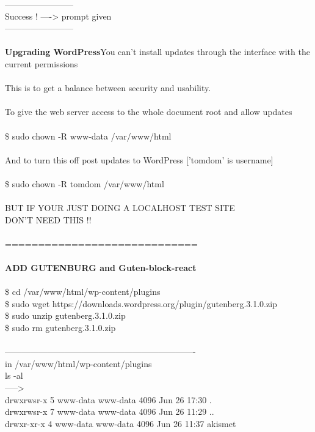 \documentclass[10pt,a4paper]{article}
\begin{document}
{{{{{{{{{{{{{{{{------------------------\\
Success ! ---->  prompt given\\
------------------------\\
\\
\textbf{Upgrading WordPress}}{\large You can't install updates through the interface with the current permissions}{\large \\
\\
This is to get a balance between security and usability.\\
\\
To give the web server access to the whole document root and allow updates\\
\\
\$ sudo chown -R www-data /var/www/html}{\large \\
\\
And to turn this off post updates to WordPress ['tomdom' is username]\\
\\
\$ sudo chown -R tomdom /var/www/html}{\large \\
\\
BUT IF YOUR JUST DOING A LOCALHOST TEST SITE \\
DON'T NEED THIS !!\\
\\
=============================\\
\\
\textbf{ADD GUTENBURG and Guten-block-react}}{\large \\
\\
\$ cd /var/www/html/wp-content/plugins}{\large \\
\$ sudo wget https://downloads.wordpress.org/plugin/gutenberg.3.1.0.zip}{\large \\
\$ sudo unzip gutenberg.3.1.0.zip\\
\$ sudo rm gutenberg.3.1.0.zip\\
\\
-------------------------------------------------------------------\\
in /var/www/html/wp-content/plugins}{\large \\
ls -al\\
----->\\
drwxrwsr-x  5 www-data   www-data 4096 Jun 26 17:30 .\\
drwxrwsr-x  7 www-data   www-data 4096 Jun 26 11:29 ..\\
drwxr-xr-x   4 www-data   www-data 4096 Jun 26 11:37 akismet\\
}}}}}}}}}}}}}}}}
\end{document}
